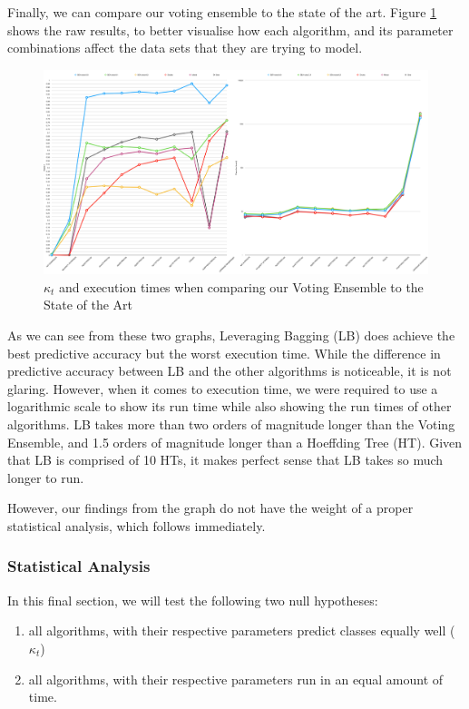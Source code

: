 \documentclass[runningheads]{llncs}
\begin{document}
Finally, we can compare our voting ensemble to the state of the art. Figure \ref{fig:raw_compare_sota_all} shows the raw results, to better visualise how each algorithm, and its parameter combinations affect the data sets that they are trying to model.

\begin{figure}
  \includegraphics[width=\linewidth]{./images/chapter5/compare_sota_all}
\caption{\label{fig:raw_compare_sota_all}$\kappa_t$ and execution times when comparing our Voting Ensemble to the State of the Art}
\end{figure}

As we can see from these two graphs, Leveraging Bagging (LB) does achieve the best predictive accuracy but the worst execution time. While the difference in predictive accuracy between LB and the other algorithms is noticeable, it is not glaring. However, when it comes to execution time, we were required to use a logarithmic scale to show its run time while also showing the run times of other algorithms. LB takes more than two orders of magnitude longer than the Voting Ensemble, and 1.5 orders of magnitude longer than a Hoeffding Tree (HT). Given that LB is comprised of 10 HTs, it makes perfect sense that LB takes so much longer to run.

However, our findings from the graph do not have the weight of a proper statistical analysis, which follows immediately.

\subsubsection{Statistical Analysis}
In this final section, we will test the following two null hypotheses:
\begin{enumerate}
\item all algorithms, with their respective parameters predict classes equally well ($\kappa_t$)
\item all algorithms, with their respective parameters run in an equal amount of time.
\end{enumerate}
\end{document}
